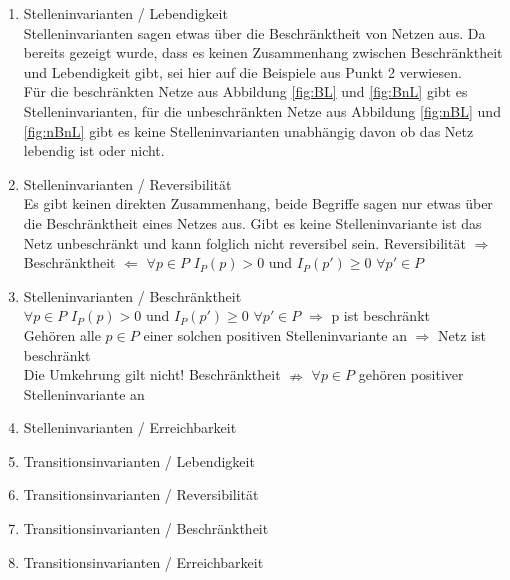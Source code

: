 \documentclass[10pt]{scrartcl}
\begin{document}
\begin{enumerate}
\item{Stelleninvarianten / Lebendigkeit}\\
Stelleninvarianten sagen etwas über die Beschränktheit von Netzen aus. Da bereits gezeigt wurde, dass es keinen Zusammenhang zwischen Beschränktheit und Lebendigkeit gibt, sei hier auf die Beispiele aus Punkt 2 verwiesen.\\
Für die beschränkten Netze aus Abbildung \ref{fig:BL} und \ref{fig:BnL} gibt es Stelleninvarianten, für die unbeschränkten Netze aus Abbildung \ref{fig:nBL} und \ref{fig:nBnL} gibt es keine Stelleninvarianten unabhängig davon ob das Netz lebendig ist oder nicht.

\item{Stelleninvarianten / Reversibilität}\\
Es gibt keinen direkten Zusammenhang, beide Begriffe sagen nur etwas über die Beschränktheit eines Netzes aus. Gibt es keine Stelleninvariante ist das Netz unbeschränkt und kann folglich nicht reversibel sein.
Reversibilität $\Rightarrow$ Beschränktheit $\Leftarrow$ $\forall p \in P$ $I_{P}(p) > 0$ und $I_{P}(p')\geq 0$ $\forall p' \in P$

\item{Stelleninvarianten / Beschränktheit}\\
$\forall p \in P$ $I_{P}(p) > 0$ und $I_{P}(p')\geq 0$ $\forall p' \in P$ $\Rightarrow$ p ist beschränkt\\
Gehören alle $p \in P$ einer solchen positiven Stelleninvariante an $\Rightarrow$ Netz ist beschränkt\\
Die Umkehrung gilt nicht! Beschränktheit $\nRightarrow$ $\forall p \in P$ gehören positiver Stelleninvariante an

\item{Stelleninvarianten / Erreichbarkeit}\\

\item{Transitionsinvarianten / Lebendigkeit}\\

\item{Transitionsinvarianten / Reversibilität}\\

\item{Transitionsinvarianten / Beschränktheit}\\

\item{Transitionsinvarianten / Erreichbarkeit}\\


\end{enumerate}
\end{document}

